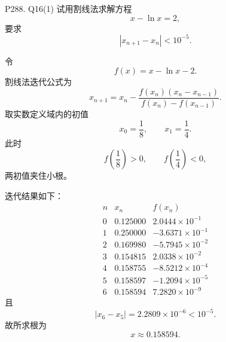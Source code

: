 \documentclass[11pt, a4paper, fontset=none]{ctexart}
\begin{document}
\begin{problem}{P288. Q16(1)}
    试用割线法求解方程
    \[
        x-\ln x=2,
    \]
    要求
    \[
        |x_{n+1}-x_n|<10^{-5}.
    \]
\end{problem}

\begin{solution}
    令
    \[
        f(x)=x-\ln x-2.
    \]
    割线法迭代公式为
    \[
        x_{n+1}
        =x_n-\frac{f(x_n)(x_n-x_{n-1})}{f(x_n)-f(x_{n-1})}.
    \]
    取实数定义域内的初值
    \[
        x_0=\frac18,\qquad x_1=\frac14.
    \]
    此时
    \[
        f\left(\frac18\right)>0,\qquad f\left(\frac14\right)<0,
    \]
    两初值夹住小根。

    迭代结果如下：
    \[
        \begin{array}{c|cc}
            n & x_n & f(x_n) \\ \hline
            0 & 0.125000 & 2.0444\times 10^{-1} \\
            1 & 0.250000 & -3.6371\times 10^{-1} \\
            2 & 0.169980 & -5.7945\times 10^{-2} \\
            3 & 0.154815 & 2.0338\times 10^{-2} \\
            4 & 0.158755 & -8.5212\times 10^{-4} \\
            5 & 0.158597 & -1.2094\times 10^{-5} \\
            6 & 0.158594 & 7.2820\times 10^{-9}
        \end{array}
    \]
    且
    \[
        |x_6-x_5|=2.2809\times 10^{-6}<10^{-5}.
    \]
    故所求根为
    \[
        \boxed{x\approx 0.158594}.
    \]
\end{solution}
\end{document}
